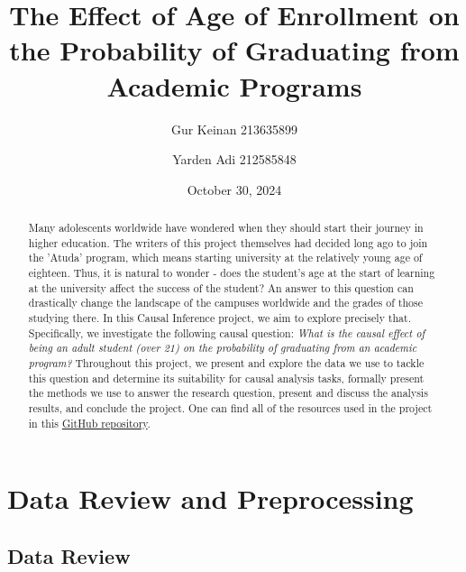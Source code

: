 \documentclass{article}
\title{The Effect of Age of Enrollment on the Probability of Graduating from Academic Programs}
\author{Gur Keinan 213635899 \and Yarden Adi 212585848}
\date{October 30, 2024}
\newcommand{\gur}[1]{{\color{teal}{Gur: #1}}}
\begin{document}
\maketitle

\begin{abstract}
    Many adolescents worldwide have wondered when they should start their journey in higher education. The writers of this project themselves had decided long ago to join the 'Atuda' program, which means starting university at the relatively young age of eighteen. Thus, it is natural to wonder - does the student's age at the start of learning at the university affect the success of the student? An answer to this question can drastically change the landscape of the campuses worldwide and the grades of those studying there. In this Causal Inference project, we aim to explore precisely that. Specifically, we investigate the following causal question: \emph{What is the causal effect of being an adult student (over 21) on the probability of graduating from an academic program?} Throughout this project, we present and explore the data we use to tackle this question and determine its suitability for causal analysis tasks, formally present the methods we use to answer the research question, present and discuss the analysis results, and conclude the project. One can find all of the resources used in the project in this \href{https://github.com/GurKeinan/Causal-Inference-Project-Effect-of-Age-on-Graduating}{GitHub repository}.
\end{abstract}

\gur{changing our question to 'What is the causal effect of enrolling as an adult student (age 21 or older) on the probability of graduating from an academic program within the allotted time?', say somewhere in the paper why we determined the target to be like this}


\section{Data Review and Preprocessing}

\gur{Opening sentence.}

\subsection{Data Review}
\end{document}
